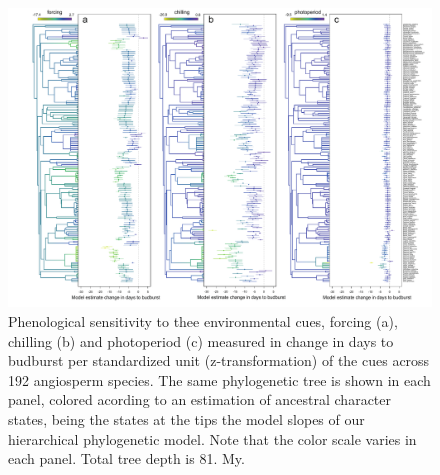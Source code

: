 \documentclass{article}\usepackage[]{graphicx}\usepackage[]{color}
\begin{document}
\begin{figure} [H]
  \begin{center}
  \includegraphics[width=16cm]{../../analyses/phylogeny/figures/muplot_phylo_allcue_angio.pdf}
  \caption{Phenological sensitivity to thee environmental cues, forcing (a), chilling (b) and photoperiod (c) measured in change in days to budburst per standardized unit (z-transformation) of the cues across 192 angiosperm species. The same phylogenetic tree is shown in each panel, colored acording to an estimation of ancestral character states, being the states at the tips the model slopes of our hierarchical phylogenetic model. Note that the color scale varies in each panel. Total tree depth is 81. My.}
  \label{fig:muplot_all}
  \end{center}
\end{figure}
\end{document}
